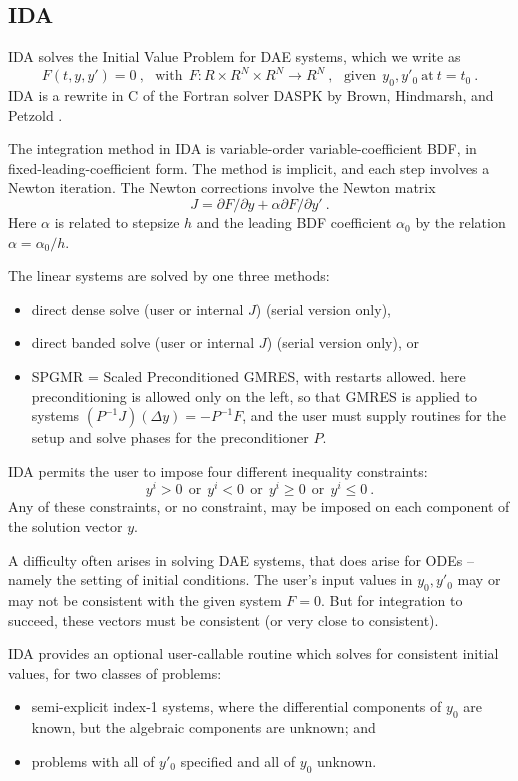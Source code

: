 \subsection{IDA}

IDA solves the  Initial Value Problem for DAE systems, which we write as
\[ F(t,y,y') = 0 ~,~~~
   \mbox{with} ~~ F:R \times R^N \times R^N \rightarrow R^N ~,~~~
   \mbox{given} ~~ y_0, y'_0 ~\mbox{at}~ t = t_0 ~. \]
IDA is a rewrite in C of the Fortran solver DASPK by Brown, Hindmarsh,
and Petzold \cite{DASPK}.

The integration method in IDA is variable-order variable-coefficient
BDF, in fixed-leading-coefficient form.  The method is implicit, and
each step involves a Newton iteration.  The Newton corrections involve
the Newton matrix
\[ J = \partial F / \partial y + \alpha \partial F / \partial y' ~. \]
Here $\alpha$ is related to stepsize $h$ and the leading BDF
coefficient $\alpha_0$ by the relation $\alpha = \alpha_0/h$.

The linear systems are solved by one three methods:
\vspace*{-.19in}
\begin{itemize}
\item direct dense solve (user or internal $J$) (serial version only),
\item direct banded solve (user or internal $J$) (serial version
      only), or
\item SPGMR = Scaled Preconditioned GMRES, with restarts allowed.
      here preconditioning is allowed only on the left, so that GMRES
      is applied to systems $(P^{-1}J)(\Delta y) = -P^{-1}F$, and
      the user must supply routines for the setup and solve phases for
      the preconditioner $P$.
\end{itemize}

IDA permits the user to impose four different inequality constraints:
\[ y^i > 0~~ \mbox{or} ~~ y^i < 0~~ \mbox{or} ~~y^i \geq 0~~
              \mbox{or} ~~y^i \leq 0 ~.\]
Any of these constraints, or no constraint, may be imposed on each
component of the solution vector $y$.

A difficulty often arises in solving DAE systems, that does arise for
ODEs -- namely the setting of initial conditions.  The user's input
values in $y_0, y'_0$ may or may not be consistent with the given
system $F = 0$.  But for integration to succeed, these vectors must
be consistent (or very close to consistent).

IDA provides an optional user-callable routine \cite{DASPKIC} which
solves for consistent initial values, for two classes of problems:
\vspace*{-.19in}
\begin{itemize}
\item semi-explicit index-1 systems, where the differential components
of $y_0$ are known, but the algebraic components are unknown; and
\item problems with all of $y'_0$ specified and all of $y_0$ unknown.
\end{itemize}

